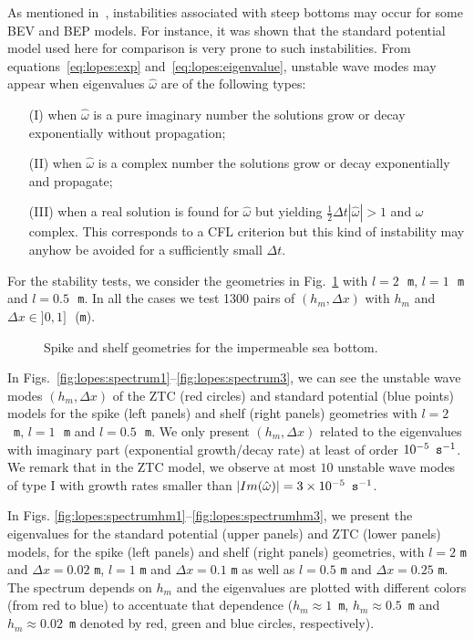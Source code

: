 As mentioned in~\cite{LovholtPedersen2009}, instabilities
 associated with steep bottoms may occur for some BEV and
 BEP models.  For instance, it was shown that the standard
 potential model used here for comparison is very prone to
 such instabilities.
From equations~\eqref{eq:lopes:exp}
and~\eqref{eq:lopes:eigenvalue},  unstable wave modes  may appear when
eigenvalues $\hat\omega$ are of the following types:
\begin{itemize}
\item[(I)] when $\hat\omega$ is a pure imaginary number the
solutions grow or decay exponentially without propagation;
\item[(II)] when $\hat\omega$ is a complex number the solutions grow
or decay exponentially and propagate;
\item[(III)] when a real solution is found for
$\hat\omega$ but  yielding $\frac{1}{2}\Delta t
|\hat\omega|>1$ and $\omega$ complex.
This corresponds to a CFL criterion but this kind
of instability may anyhow be avoided for a sufficiently
small $\Delta t$.
\end{itemize}

For the  stability tests, we consider the geometries
in Fig.~\ref{fig:lopes:spikeshelf}
with  $l=2$\,~{\tt m}, $l=1$\,~{\tt m} and $l=0.5$\,~{\tt m}.
In all the cases we test  1300 pairs of
$(h_m,\Delta x)$ with $ h_m$ and $\Delta x\in ]0,1]$\,~({\tt m}).
\begin{figure}
{\small
\begin{center}
\end{center}
}
\caption{Spike and shelf geometries for the impermeable sea bottom.}
\label{fig:lopes:spikeshelf}
\end{figure}

In
Figs.~\ref{fig:lopes:spectrum1}--\ref{fig:lopes:spectrum3},
we can see the unstable wave modes $(h_m,\Delta x)$ of the ZTC
(red circles) and standard potential (blue points) models
for the spike (left panels) and shelf (right panels)
geometries with $l=2$\,~{\tt m}, $l=1$\,~{\tt m} and
$l=0.5$\,~{\tt m}.  We only present $(h_m,\Delta x)$ related
to the eigenvalues with imaginary part (exponential
growth/decay rate) at least of order $10^{-5}\,~{\tt
s}^{-1}$.  We remark that in the ZTC model, we
observe at most $10$ unstable wave modes of type I
with growth rates smaller than $|Im(\hat\omega)|=3\times
10^{-5}\,~{\tt s}^{-1}$.



In Figs. \ref{fig:lopes:spectrumhm1}--\ref{fig:lopes:spectrumhm3},
we present the eigenvalues for the standard potential
 (upper panels) and ZTC (lower panels)
 models, for the spike (left panels) and
 shelf (right panels) geometries, with  $l=2$ {\tt m} and
 $\Delta x=0.02$ {\tt m}, $l=1$ {\tt m} and
 $\Delta x=0.1$ {\tt m} as well as
$l=0.5$ {\tt m} and
 $\Delta x=0.25$ {\tt m}.
The  spectrum   depends  on $h_m$ and the eigenvalues are
plotted with different colors (from red to blue) to accentuate that
dependence ($h_m\approx 1$~{\tt m},
$h_m\approx 0.5$~{\tt m}
 and $h_m\approx 0.02$~{\tt m} denoted by red, green and
 blue circles, respectively).


